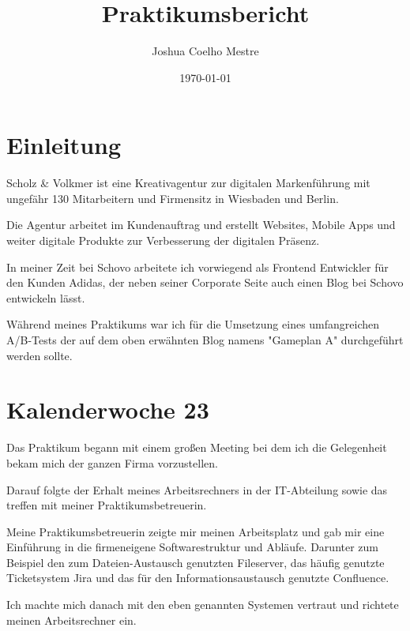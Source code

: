 \documentclass[11pt]{article} %
\title{Praktikumsbericht}
\author{Joshua Coelho Mestre}
\date{\today} %
\begin{document}
\maketitle


\newpage
\tableofcontents %
\newpage %

\section{Einleitung} \label{sec:einf}
Scholz \& Volkmer ist eine Kreativagentur zur digitalen Markenführung mit ungefähr 130 Mitarbeitern und Firmensitz in Wiesbaden und Berlin.

Die Agentur arbeitet im Kundenauftrag und erstellt Websites, Mobile Apps und weiter digitale Produkte zur Verbesserung der digitalen Präsenz.

In meiner Zeit bei Schovo arbeitete ich vorwiegend als Frontend Entwickler für den Kunden Adidas, der neben seiner Corporate Seite auch einen Blog bei Schovo entwickeln lässt.

Während meines Praktikums war ich für die Umsetzung eines umfangreichen A/B-Tests der auf dem oben erwähnten Blog namens "Gameplan A" durchgeführt werden sollte.


\newpage

\section{Kalenderwoche 23} \label{sec:kw23}

Das Praktikum begann mit einem großen Meeting bei dem ich die Gelegenheit bekam mich der ganzen Firma vorzustellen.

Darauf folgte der Erhalt meines Arbeitsrechners in der IT-Abteilung sowie das treffen mit meiner Praktikumsbetreuerin.

Meine Praktikumsbetreuerin zeigte mir meinen Arbeitsplatz und gab mir eine Einführung in die firmeneigene Softwarestruktur und Abläufe. Darunter zum Beispiel den zum Dateien-Austausch genutzten Fileserver, das häufig genutzte Ticketsystem Jira und das für den Informationsaustausch genutzte Confluence.

Ich machte mich danach mit den eben genannten Systemen vertraut und richtete meinen Arbeitsrechner ein.
\end{document}
